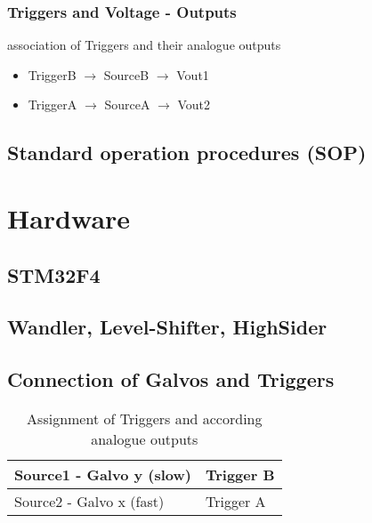 \documentclass[master,english,smartquotes,apa]{hgbthesis}
\begin{document}
		\subsubsection{Triggers and Voltage - Outputs}
		association of Triggers and their analogue outputs
		\begin{itemize}
			\item TriggerB $\rightarrow$ SourceB $\rightarrow$ Vout1
			\item TriggerA $\rightarrow$ SourceA $\rightarrow$ Vout2
		\end{itemize}



		\subsection{Standard operation procedures (SOP)}
		{	\scriptsize
			
		}

		\section{Hardware}
			\subsection{STM32F4}
			
			\subsection{Wandler, Level-Shifter, HighSider}
			\subsection{Connection of Galvos and Triggers}
				\begin{table}[h!]
					 \begin{tabular}{|p{5.5cm}|p{6cm}|} \hline
					Source1	- Galvo y (slow)& Trigger B\\ \hline
					Source2	- Galvo x (fast)& Trigger A\\ \hline
					 \end{tabular}
					 \caption{Assignment of Triggers and according analogue outputs}
				\end{table}
\end{document}

